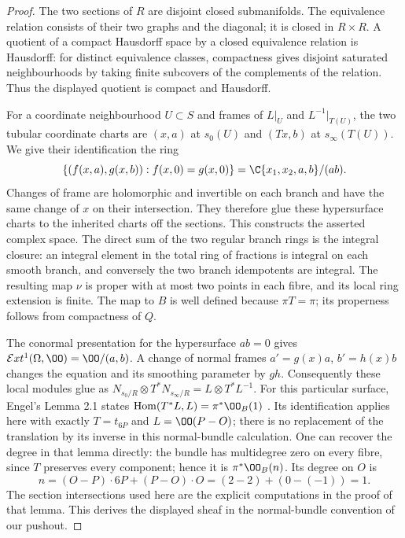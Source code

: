 \begin{proof}
The two sections of $R$ are disjoint closed submanifolds. The
equivalence relation consists of their two graphs and the diagonal;
it is closed in $R\times R$. A quotient of a compact Hausdorff space
by a closed equivalence relation is Hausdorff: for distinct equivalence
classes, compactness gives disjoint saturated neighbourhoods by taking
finite subcovers of the complements of the relation. Thus the displayed
quotient is compact and Hausdorff.

For a coordinate neighbourhood $U\subset S$ and frames of $L|_U$ and
$L^{-1}|_{T(U)}$, the two tubular coordinate charts are $(x,a)$ at
$s_0(U)$ and $(Tx,b)$ at $s_\infty(T(U))$. We give their identification
the ring
\[
 \{(f(x,a),g(x,b)):f(x,0)=g(x,0)\}
   =\C\{x_1,x_2,a,b\}/(ab).
\]
Changes of frame are holomorphic and invertible on each branch and
have the same change of $x$ on their intersection. They therefore glue
these hypersurface charts to the inherited charts off the sections.
This constructs the asserted complex space. The direct sum of the two
regular branch rings is the integral closure: an integral element in
the total ring of fractions is integral on each smooth branch, and
conversely the two branch idempotents are integral. The resulting map
$\nu$ is proper with at most two points in each fibre, and its local
ring extension is finite. The map to $B$ is well defined because
$\pi T=\pi$; its properness follows from compactness of $Q$.

The conormal presentation for the hypersurface $ab=0$ gives
$\mathcal Ext^1(\Omega,\OO)=\OO/(a,b)$. A change of normal frames
$a'=g(x)a$, $b'=h(x)b$ changes the equation and its smoothing parameter
by $gh$. Consequently these local modules glue as
$N_{s_0/R}\otimes T^*N_{s_\infty/R}=L\otimes T^*L^{-1}$.
For this particular surface, Engel's Lemma 2.1 states
$\operatorname{Hom}(T^*L,L)=\pi^*\OO_B(1)$ \cite[Lemma 2.1]{E26}.
Its identification applies here with exactly $T=t_{6P}$ and $L=\OO(P-O)$;
there is no replacement of the translation by its inverse in this
normal-bundle calculation. One can recover the degree in that lemma
directly: the bundle has multidegree zero on every fibre, since $T$
preserves every component; hence it is $\pi^*\OO_B(n)$. Its degree on
$O$ is
\[
 n=(O-P)\cdot 6P+(P-O)\cdot O=(2-2)+(0-(-1))=1.
\]
The section intersections used here are the explicit computations in
the proof of that lemma. This derives the displayed sheaf in the
normal-bundle convention of our pushout.
\end{proof}

